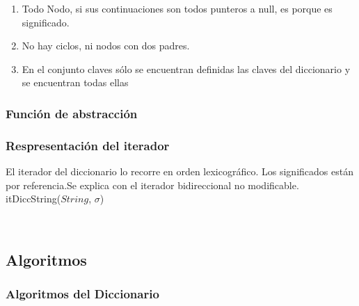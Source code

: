 \begin{enumerate}
\item Todo Nodo, si sus continuaciones son todos punteros a null, es porque es significado.
\item No hay ciclos, ni nodos con dos padres.
\item En el conjunto claves sólo se encuentran definidas las claves del diccionario y se encuentran todas ellas
\end{enumerate}

\subsubsection*{Función de abstracción}

\subsubsection*{Respresentación del iterador}

  El iterador del diccionario lo recorre en orden lexicográfico. Los significados están por referencia.Se explica con el iterador bidireccional no modificable.
itDiccString($String$, $\sigma$)

  

  ~




\subsection{Algoritmos}
\subsubsection{Algoritmos del Diccionario}

